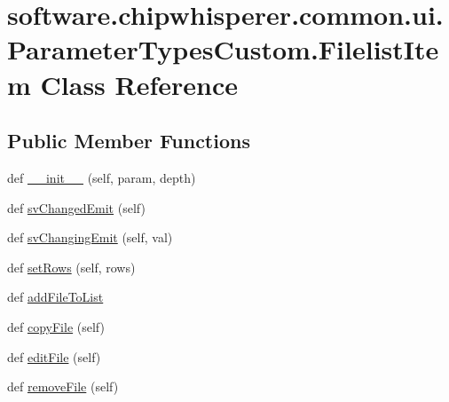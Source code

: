 \hypertarget{classsoftware_1_1chipwhisperer_1_1common_1_1ui_1_1ParameterTypesCustom_1_1FilelistItem}{}\section{software.\+chipwhisperer.\+common.\+ui.\+Parameter\+Types\+Custom.\+Filelist\+Item Class Reference}
\label{classsoftware_1_1chipwhisperer_1_1common_1_1ui_1_1ParameterTypesCustom_1_1FilelistItem}
\subsection*{Public Member Functions}
\begin{DoxyCompactItemize}
\item 
def \hyperlink{classsoftware_1_1chipwhisperer_1_1common_1_1ui_1_1ParameterTypesCustom_1_1FilelistItem_af2835305fa33355d4461e3a66e9b414c}{\+\_\+\+\_\+init\+\_\+\+\_\+} (self, param, depth)
\item 
def \hyperlink{classsoftware_1_1chipwhisperer_1_1common_1_1ui_1_1ParameterTypesCustom_1_1FilelistItem_a117fddf16dc9e24b688981acc2ec45b6}{sv\+Changed\+Emit} (self)
\item 
def \hyperlink{classsoftware_1_1chipwhisperer_1_1common_1_1ui_1_1ParameterTypesCustom_1_1FilelistItem_a3acfd89045b735ccbbd79ba94d8d6688}{sv\+Changing\+Emit} (self, val)
\item 
def \hyperlink{classsoftware_1_1chipwhisperer_1_1common_1_1ui_1_1ParameterTypesCustom_1_1FilelistItem_aa810e75dfeae687874689ee84b220c11}{set\+Rows} (self, rows)
\item 
def \hyperlink{classsoftware_1_1chipwhisperer_1_1common_1_1ui_1_1ParameterTypesCustom_1_1FilelistItem_a3eace9967afc91daac3b0786c178b71b}{add\+File\+To\+List}
\item 
def \hyperlink{classsoftware_1_1chipwhisperer_1_1common_1_1ui_1_1ParameterTypesCustom_1_1FilelistItem_ad5c94c3131dfeb4d1d78818aebc3e929}{copy\+File} (self)
\item 
def \hyperlink{classsoftware_1_1chipwhisperer_1_1common_1_1ui_1_1ParameterTypesCustom_1_1FilelistItem_abb98ce8769757e449861b3fb5e7810a8}{edit\+File} (self)
\item 
def \hyperlink{classsoftware_1_1chipwhisperer_1_1common_1_1ui_1_1ParameterTypesCustom_1_1FilelistItem_a5478f032f87fcf47b835fb04d5273cb5}{remove\+File} (self)
\item 

\end{DoxyCompactItemize}

